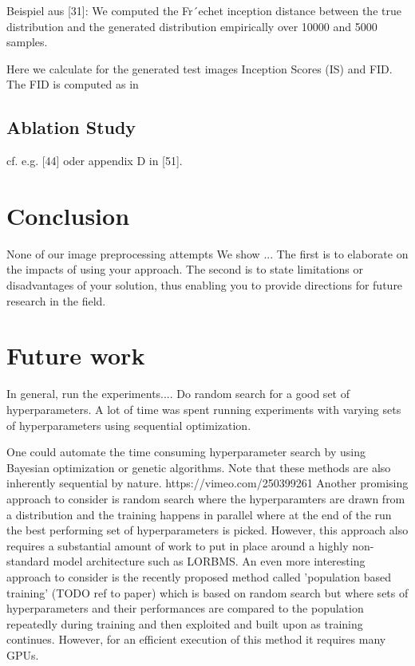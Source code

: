 \documentclass[12pt,a4paper]{article}
\begin{document}
Beispiel aus [31]: We computed the Fr´echet inception distance between the true distribution and the generated
distribution empirically over 10000 and 5000 samples.

Here we calculate for the generated test images Inception Scores (IS) and FID. The FID is computed as in 


\subsection{Ablation Study}
cf. e.g. [44] oder appendix D in [51].

\section{Conclusion}
None of our image preprocessing attempts
We show ...
The first is
to elaborate on the impacts of using your approach. The
second is to state limitations or disadvantages of your solution,
thus enabling you to provide directions for future
research in the field.

\section{Future work}
In general, run the experiments.... Do random search for a good set of hyperparameters. A lot of time was spent running experiments with varying sets of hyperparameters using sequential optimization.

\par One could automate the time consuming hyperparameter search by using Bayesian optimization or genetic algorithms. Note that these methods are also inherently sequential by nature. https://vimeo.com/250399261
Another promising approach to consider is random search where the hyperparamters are drawn from a distribution and the training happens in parallel where at the end of the run the best performing set of hyperparameters is picked. However, this approach also requires a substantial amount of work to put in place around a highly non-standard model architecture such as LORBMS. An even more interesting approach to consider is the recently proposed method called 'population based training' (TODO ref to paper) which is based on random search but where sets of hyperparameters and their performances are compared to the population repeatedly during training and then exploited and built upon as training continues. However, for an efficient execution of this method it requires many GPUs. 
\end{document}

